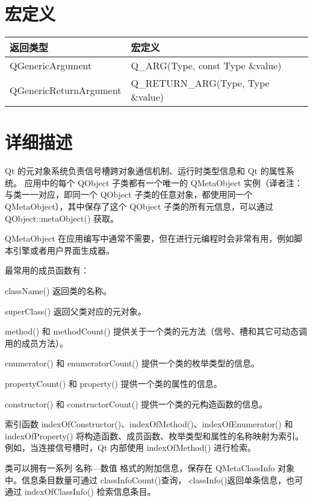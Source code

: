 \section{宏定义}

\begin{tabular}{|l|l|}
\hline
返回类型	& 宏定义 \\
\hline
QGenericArgument	& Q\_ARG(Type, const Type \&value) \\
\hline
QGenericReturnArgument&	Q\_RETURN\_ARG(Type, Type \&value) \\
\hline
\end{tabular}



\section{详细描述}

Qt 的元对象系统负责信号槽跨对象通信机制、运行时类型信息和 Qt 的属性系统。
应用中的每个 QObject 子类都有一个唯一的 QMetaObject 实例（译者注：与类一一对应，即同一个 QObject 子类的任意对象，都使用同一个 QMetaObject），其中保存了这个 QObject 子类的所有元信息，可以通过 QObject::metaObject() 获取。

QMetaObject 在应用编写中通常不需要，但在进行元编程时会非常有用，例如脚本引擎或者用户界面生成器。

最常用的成员函数有：

\begin{compactitem}
\item className() 返回类的名称。
\item superClass() 返回父类对应的元对象。
\item method() 和 methodCount() 提供关于一个类的元方法（信号、槽和其它可动态调用的成员方法）。
\item enumerator() 和 enumeratorCount() 提供一个类的枚举类型的信息。
\item propertyCount() 和 property() 提供一个类的属性的信息。
\item constructor() 和 constructorCount() 提供一个类的元构造函数的信息。
\end{compactitem}


索引函数 indexOfConstructor()、indexOfMethod()、indexOfEnumerator() 和 indexOfProperty() 将构造函数、成员函数、枚举类型和属性的名称映射为索引。例如，当连接信号槽时，Qt 内部使用 indexOfMethod() 进行检索。

类可以拥有一系列 名称—数值 格式的附加信息，保存在 QMetaClassInfo 对象中。信息条目数量可通过 classInfoCount()查询， classInfo()返回单条信息，也可通过 indexOfClassInfo() 检索信息条目。

